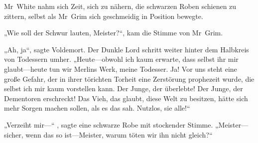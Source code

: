 Mr~White nahm sich Zeit, sich zu nähern, die schwarzen Roben schienen zu zittern, selbst als Mr~Grim sich geschmeidig in Position bewegte.

„Wie soll der Schwur lauten, Meister?“, kam die Stimme von Mr~Grim.

„Ah, ja“, sagte Voldemort. Der Dunkle Lord schritt weiter hinter dem Halbkreis von Todessern umher.
„Heute—obwohl ich kaum erwarte, dass selbst ihr mir glaubt—heute tun wir Merlins Werk, meine Todesser. Ja! Vor uns steht eine große Gefahr, der in ihrer törichten Torheit eine Zerstörung prophezeit wurde, die selbst ich mir kaum vorstellen kann. Der Junge, der überlebte! Der Junge, der Dementoren erschreckt! Das Vieh, das glaubt, diese Welt zu besitzen, hätte sich mehr Sorgen machen sollen, als es das sah. Nutzlos, sie alle!“

„Verzeiht mir—“ , sagte eine schwarze Robe mit stockender Stimme. „Meister—sicher, wenn das so ist—Meister, warum töten wir ihn nicht gleich?“

